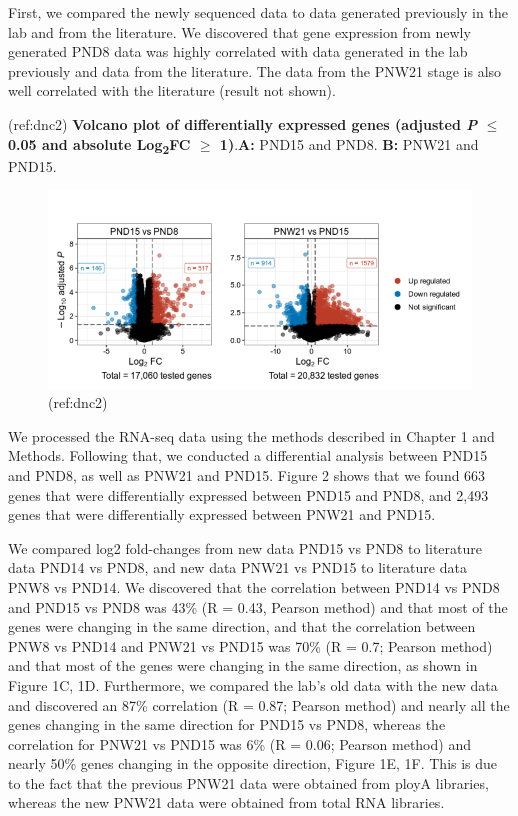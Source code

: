\documentclass[12pt,twoside]{reedthesis}
\begin{document}
First, we compared the newly sequenced data to data generated previously
in the lab and from the literature. We discovered that gene expression
from newly generated PND8 data was highly correlated with data generated
in the lab previously and data from the literature. The data from the
PNW21 stage is also well correlated with the literature (result not
shown).

(ref:dnc2)
\textbf{Volcano plot of differentially expressed genes (adjusted \textit{P} $\leq$ 0.05 and absolute Log\textsubscript{2}FC $\geq$ 1)}.\newline \textbf{A:}
PND15 and PND8. \textbf{B:} PNW21 and PND15.
\begin{figure}[h]

{\centering \includegraphics{thesis_files/figure-latex/dn2-1} 

}

\caption[Volcano plot of differentially expressed genes]{(ref:dnc2)}\label{fig:dn2}
\end{figure}
We processed the RNA-seq data using the methods described in Chapter 1
and Methods. Following that, we conducted a differential analysis
between PND15 and PND8, as well as PNW21 and PND15. Figure 2 shows that
we found 663 genes that were differentially expressed between PND15 and
PND8, and 2,493 genes that were differentially expressed between PNW21
and PND15.

We compared log2 fold-changes from new data PND15 vs PND8 to literature
data PND14 vs PND8, and new data PNW21 vs PND15 to literature data PNW8
vs PND14. We discovered that the correlation between PND14 vs PND8 and
PND15 vs PND8 was 43\% (R = 0.43, Pearson method) and that most of the
genes were changing in the same direction, and that the correlation
between PNW8 vs PND14 and PNW21 vs PND15 was 70\% (R = 0.7; Pearson
method) and that most of the genes were changing in the same direction,
as shown in Figure 1C, 1D. Furthermore, we compared the lab's old data
with the new data and discovered an 87\% correlation (R = 0.87; Pearson
method) and nearly all the genes changing in the same direction for
PND15 vs PND8, whereas the correlation for PNW21 vs PND15 was 6\% (R =
0.06; Pearson method) and nearly 50\% genes changing in the opposite
direction, Figure 1E, 1F. This is due to the fact that the previous
PNW21 data were obtained from ployA libraries, whereas the new PNW21
data were obtained from total RNA libraries.
\end{document}
